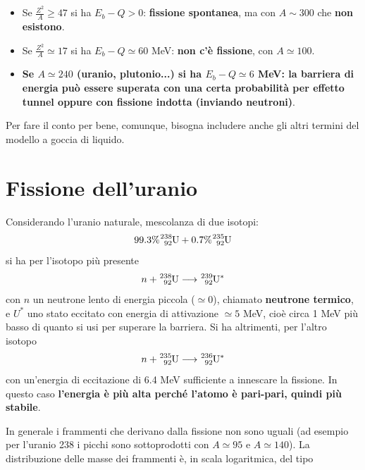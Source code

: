 \documentclass[a4paper,11pt,twoside,openany]{book}
\theoremstyle{definition}
\theoremstyle{plain}
\theoremstyle{plain}
\theoremstyle{definition}
\begin{document}
\begin{itemize}
\item Se $\frac{Z^2}{A}\ge 47$ si ha $E_b-Q>0$: \textbf{fissione spontanea}, ma con $A\sim 300$ che \textbf{non esistono}.
\item Se $\frac{Z^2}{A}\simeq 17$ si ha $E_b-Q\simeq 60$ MeV: \textbf{non c'è fissione}, con $A\simeq 100$.
\item \textbf{Se $A\simeq 240$ (uranio, plutonio...) si ha $E_b-Q\simeq 6$ MeV: la barriera di energia può essere superata con una certa probabilità per effetto tunnel oppure con fissione indotta (inviando neutroni)}.
\end{itemize}

Per fare il conto per bene, comunque, bisogna includere anche gli altri termini del modello a goccia di liquido.

\section{Fissione dell'uranio} %
Considerando l'uranio naturale, mescolanza di due isotopi: $$99.3\%\ce{^{238}_{92}U}+0.7\%\ce{^{235}_{92}U}$$ si ha per l'isotopo più presente
\begin{equation}\begin{split}
n+\ce{^{238}_{92}U}\longrightarrow \ce{^{239}_{92}U}^*
\end{split}\end{equation}
con $n$ un neutrone lento di energia piccola ($\simeq 0$), chiamato \textbf{neutrone termico}, e $U^*$ uno stato eccitato con energia di attivazione $\simeq 5$ MeV, cioè circa 1 MeV più basso di quanto si usi per superare la barriera. Si ha altrimenti, per l'altro isotopo
\begin{equation}\begin{split}
n+\ce{^{235}_{92}U}\longrightarrow \ce{^{236}_{92}U}^*
\end{split}\end{equation}
con un'energia di eccitazione di 6.4 MeV sufficiente a innescare la fissione. In questo caso \textbf{l'energia è più alta perché l'atomo è pari-pari, quindi più stabile}.

In generale i frammenti che derivano dalla fissione non sono uguali (ad esempio per l'uranio 238 i picchi sono sottoprodotti con $A\simeq 95$ e $A\simeq 140$). La distribuzione delle masse dei frammenti è, in scala logaritmica, del tipo
\end{document}
